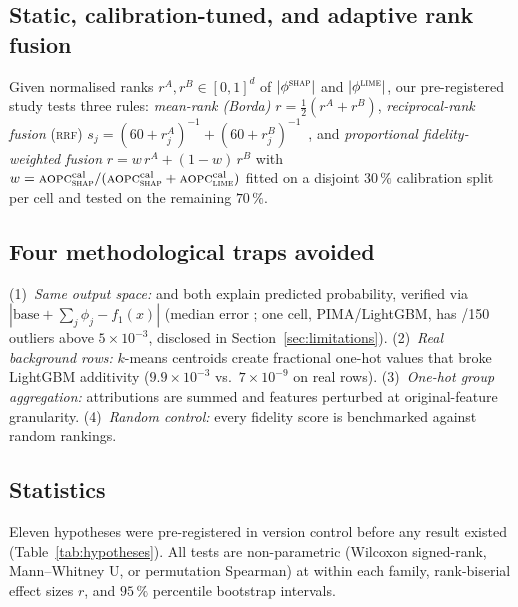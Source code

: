 \subsection{Static, calibration-tuned, and adaptive rank fusion}\label{sec:method-hybrid}
Given normalised ranks $r^{A}, r^{B}\in[0,1]^d$ of $|\phi^{\textsc{shap}}|$ and $|\phi^{\textsc{lime}}|$,
our pre-registered study tests three rules: \emph{mean-rank (Borda)}
$r=\tfrac{1}{2}(r^{A}+r^{B})$, \emph{reciprocal-rank fusion} (\textsc{rrf})
$s_j=(60+r^{A}_j)^{-1}+(60+r^{B}_j)^{-1}$~\cite{cormack2009reciprocal}, and
\emph{proportional fidelity-weighted fusion} $r=w\,r^{A}+(1-w)\,r^{B}$ with
$w=\textsc{aopc}{}^{\text{cal}}_{\textsc{shap}}/(\textsc{aopc}{}^{\text{cal}}_{\textsc{shap}}+\textsc{aopc}{}^{\text{cal}}_{\textsc{lime}})$
fitted on a disjoint $30\,\%$ calibration split per cell and tested on the remaining
$70\,\%$. 

\subsection{Four methodological traps avoided}\label{sec:pitfalls}
(1)~\emph{Same output space:} \shap{} and \lime{} both explain predicted probability,
verified via $|\text{base}+\sum_j\phi_j - f_1(x)|$ (median error \AdditivityMedianMax{};
one cell, PIMA/LightGBM, has \AdditivityWorstOutliers{}/150 outliers above $5\times 10^{-3}$,
disclosed in Section~\ref{sec:limitations}). (2)~\emph{Real background rows:} $k$-means
centroids create fractional one-hot values that broke LightGBM additivity
($9.9\times 10^{-3}$ vs.\ $7\times 10^{-9}$ on real rows). (3)~\emph{One-hot group
aggregation:} attributions are summed and features perturbed at original-feature
granularity. (4)~\emph{Random control:} every fidelity score is benchmarked against random
rankings.

\subsection{Statistics}\label{sec:method-stats}
Eleven hypotheses were pre-registered in version control before any result existed
(Table~\ref{tab:hypotheses}). All tests are non-parametric (Wilcoxon signed-rank,
Mann--Whitney U, or permutation Spearman) at  within each family, rank-biserial effect sizes $r$, and
$95\,\%$ percentile bootstrap intervals.
